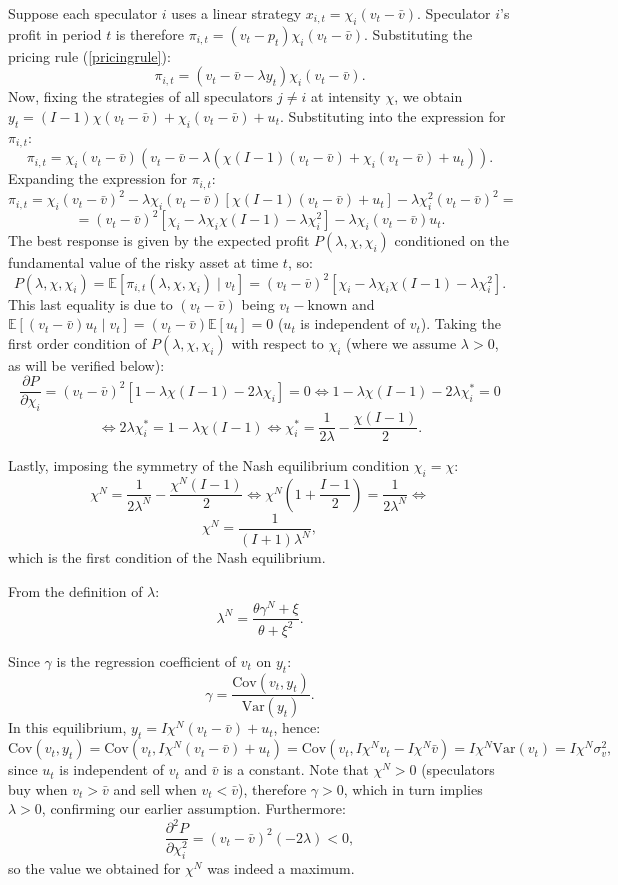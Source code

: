 \documentclass[11pt]{article}
\begin{document}
Suppose each speculator $i$ uses a linear strategy $x_{i,t}=\chi_i(v_t-\bar{v})$. 
Speculator $i$'s profit in period $t$ is therefore $\pi_{i,t}=(v_t-p_t)\chi_i(v_t-\bar{v})$. Substituting the pricing rule (\ref{pricingrule}):
\[
\pi_{i,t}=(v_t-\bar{v}-\lambda y_t)\chi_i(v_t-\bar{v}).
\]
Now, fixing the strategies of all speculators $j\neq i$ at intensity $\chi$, we obtain $y_t=(I-1)\chi(v_t-\bar{v})+\chi_i(v_t-\bar{v})+u_t.$ Substituting into the expression for $\pi_{i,t}$:
\[
\pi_{i,t}=\chi_i(v_t-\bar{v})\left(v_t-\bar{v}-\lambda(\chi(I-1)(v_t-\bar{v})+\chi_i(v_t-\bar{v})+u_t)\right).
\]
Expanding the expression for $\pi_{i,t}$:
\[
\pi_{i,t}=\chi_i(v_t-\bar{v})^2-\lambda \chi_i(v_t-\bar{v})\left[\chi(I-1)(v_t-\bar{v})+u_t\right]-\lambda \chi_i^2(v_t-\bar{v})^2=
\]
\[
=(v_t-\bar{v})^2\left[\chi_i-\lambda\chi_i\chi(I-1)-\lambda \chi_i^2\right]-\lambda \chi_i(v_t-\bar{v})u_t.
\]
The best response is given by the expected profit $P(\lambda,\chi,\chi_i)$ conditioned 
on the fundamental value of the risky asset at time $t$, so:
\[
P(\lambda,\chi,\chi_i)=\mathbb{E}[\pi_{i,t}(\lambda, \chi,\chi_i)\mid v_t]=(v_t-\bar{v})^2\left[\chi_i-\lambda \chi_i\chi (I-1)-\lambda \chi_i^2\right].
\]
This last equality is due to $(v_t-\bar{v})$ being $v_t-$known and 
$\mathbb{E}[(v_t-\bar{v})u_t\mid v_t]=(v_t-\bar{v})\mathbb{E}[u_t]=0$ 
($u_t$ is independent of $v_t$). Taking the first order condition of $P(\lambda,\chi,\chi_i)$ with respect to $\chi_i$ 
(where we assume $\lambda>0$, as will be verified below):
\[
\frac{\partial P}{\partial \chi_i}=(v_t-\bar{v})^2\left[1-\lambda \chi(I-1)-2\lambda\chi_i\right]=0\iff 1-\lambda \chi(I-1)-2\lambda\chi_i^*=0
\]
\[
\iff 2\lambda \chi_i^*=1-\lambda \chi(I-1)\iff \chi_i^*=\frac{1}{2\lambda}-\frac{\chi(I-1)}{2}.
\]

Lastly, imposing the symmetry of the Nash equilibrium condition $\chi_i=\chi$:
\[
\chi^N=\frac{1}{2\lambda^N}-\frac{\chi^N(I-1)}{2}\iff \chi^N\left(1+\frac{I-1}{2}\right)=\frac{1}{2\lambda^N}\iff
\]
\begin{equation}
    \chi^N=\frac{1}{(I+1)\lambda^N},
\end{equation}
which is the first condition of the Nash equilibrium.

From the definition of $\lambda$:
\begin{equation}
    \lambda^N=\frac{\theta \gamma^N+\xi}{\theta+\xi^2}.
\end{equation}

Since $\gamma$ is the regression coefficient of $v_t$ on $y_t$:
\begin{equation}
    \gamma=\frac{\text{Cov}(v_t,y_t)}{\text{Var}(y_t)}.
\end{equation}
In this equilibrium, $y_t=I\chi^N(v_t-\bar{v})+u_t$, hence:
\[
\text{Cov}(v_t,y_t)=\text{Cov}(v_t,I\chi^N(v_t-\bar{v})+u_t)=\text{Cov}(v_t,I\chi^N v_t-I\chi^N \bar{v})=I\chi^N\text{Var}(v_t)=I\chi^N \sigma_v^2,
\]
since $u_t$ is independent of $v_t$ and $\bar{v}$ is a constant. Note that $\chi^N>0$ 
(speculators buy when $v_t>\bar{v}$ and sell when $v_t<\bar{v}$), therefore $\gamma>0$, 
which in turn implies $\lambda>0$, confirming our earlier assumption. Furthermore:
\[
\frac{\partial^2 P}{\partial \chi_i^2}=(v_t-\bar{v})^2(-2\lambda)<0,
\]
so the value we obtained for $\chi^N$ was indeed a maximum.
\end{document}

